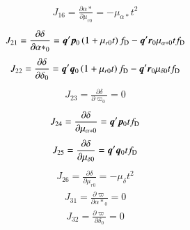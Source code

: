 \documentclass{aa}
\def\vec#1{\ensuremath{\mathchoice{\mbox{\boldmath$\displaystyle#1$}}
{\mbox{\boldmath$\textstyle#1$}}
{\mbox{\boldmath$\scriptstyle#1$}}
{\mbox{\boldmath$\scriptscriptstyle#1$}}}}
\begin{document}
\begin{equation*}
 \begin{aligned}
    J_{16}=\frac{\partial\alpha*}{\partial\mu_{r0}}=
    -\mu_{\alpha*}t^2
 \end{aligned}
\end{equation*}
\begin{equation*}
 \begin{aligned}
    J_{21}=\frac{\partial\delta}{\partial{\alpha*}_0}=
    \vec{q}'\vec{p}_0\left(1+\mu_{r0}t\right)f_\mathrm{D}
    -\vec{q}'\vec{r}_0\mu_{\alpha*0}tf_\mathrm{D}
 \end{aligned}
\end{equation*}
\begin{equation*}
 \begin{aligned}
    J_{22}=\frac{\partial\delta}{\partial\delta_0}=
    \vec{q}'\vec{q}_0\left(1+\mu_{r0}t\right)f_\mathrm{D}
    -\vec{q}'\vec{r}_0\mu_{\delta0}tf_\mathrm{D}
 \end{aligned}
\end{equation*}
\begin{equation*}
 \begin{aligned}
    J_{23}=\frac{\partial\delta}{\partial\varpi_0}=0
 \end{aligned}
\end{equation*}
\begin{equation*}
 \begin{aligned}
    J_{24}=\frac{\partial\delta}{\partial\mu_{\alpha*0}}=
    \vec{q}'\vec{p}_0tf_\mathrm{D}
 \end{aligned}
\end{equation*}
\begin{equation*}
 \begin{aligned}
    J_{25}=\frac{\partial\delta}{\partial\mu_{\delta0}}=
    \vec{q}'\vec{q}_0tf_\mathrm{D}
 \end{aligned}
\end{equation*}
\begin{equation*}
 \begin{aligned}
    J_{26}=\frac{\partial\delta}{\partial\mu_{r0}}=
    -\mu_{\delta}t^2
 \end{aligned}
\end{equation*}
\begin{equation*}
 \begin{aligned}
    J_{31}=\frac{\partial\varpi}{\partial{\alpha*}_0}=0
 \end{aligned}
\end{equation*}
\begin{equation*}
 \begin{aligned}
    J_{32}=\frac{\partial\varpi}{\partial\delta_0}=0
 \end{aligned}
\end{equation*}
\end{document}
